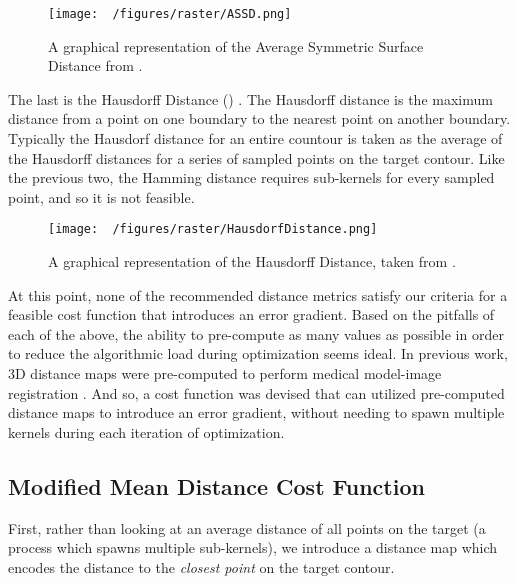 \begin{figure}[h!]
  \centering
  \texttt{[image: ~/figures/raster/ASSD.png]}
  \caption{A graphical representation of the Average Symmetric Surface Distance from \cite{reinkeUnderstandingMetricrelatedPitfalls2023,reinkeCommonLimitationsImage2023}.}
  \label{fig:ASSD}
\end{figure}

The last is the Hausdorff Distance () \cite{huttenlocherMultiresolutionTechniqueComparing1993,felzenszwalbDistanceTransformsSampled2012,huttenlocherComparingImagesUsing1993}.
The Hausdorff distance is the maximum distance from a point on one boundary to the nearest point on another boundary. Typically the Hausdorf distance for an entire countour is taken as the average of the Hausdorff distances for a series of sampled points on the target contour.
Like the previous two, the Hamming distance requires sub-kernels for every sampled point, and so it is not feasible.


\begin{figure}[h!]
  \centering
  \texttt{[image: ~/figures/raster/HausdorfDistance.png]}
  \caption{A graphical representation of the Hausdorff Distance, taken from \cite{reinkeCommonLimitationsImage2023,reinkeUnderstandingMetricrelatedPitfalls2023}.}
  \label{fig:HD}
\end{figure}

At this point, none of the recommended distance metrics satisfy our criteria for a feasible cost function that introduces an error gradient.
Based on the pitfalls of each of the above, the ability to pre-compute as many values as possible in order to reduce the algorithmic load during optimization seems ideal.
In previous work, 3D distance maps were pre-computed to perform medical model-image registration \cite{lavalleeRecoveringPositionOrientation1995,zuffiModelbasedMethodReconstruction1999}.
And so, a cost function was devised that can utilized pre-computed distance maps to introduce an error gradient, without needing to spawn multiple kernels during each iteration of optimization.

\subsection{Modified Mean Distance Cost Function}
First, rather than looking at an average distance of all points on the target (a process which spawns multiple sub-kernels), we introduce a distance map which encodes the distance to the \emph{closest point} on the target contour.

